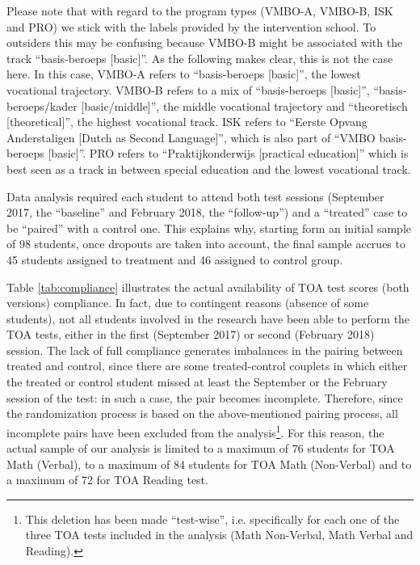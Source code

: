 \documentclass[ 12 pt]{article}
\begin{document}
Please note that with regard to the program types (VMBO-A, VMBO-B, ISK and PRO) we stick with the labels provided by the intervention school. To outsiders this may be confusing because VMBO-B might be associated with the track \enquote{basis-beroeps [basic]}. As the following makes clear, this is not the case here. In this case, VMBO-A refers to \enquote{basis-beroeps [basic]}, the lowest vocational trajectory. VMBO-B refers to a mix of \enquote{basis-beroeps [basic]}, \enquote{basis-beroeps/kader [basic/middle]}, the middle vocational trajectory and \enquote{theoretisch [theoretical]}, the highest vocational track. ISK refers to \enquote{Eerste Opvang Anderstaligen [Dutch as Second Language]}, which is also part of \enquote{VMBO basis-beroeps [basic]}. PRO refers to \enquote{Praktijkonderwijs [practical education]} which is best seen as a track in between special education and the lowest vocational track.

Data analysis required each student to attend both test sessions (September 2017, the \enquote{baseline} and February 2018, the \enquote{follow-up}) and a \enquote{treated} case to be \enquote{paired} with a control one. This explains why, starting form an initial sample of 98 students, once dropouts are taken into account, the final sample accrues to 45 students assigned to treatment and 46 assigned to control group.

Table \ref{tab:compliance} illustrates the actual availability of TOA test scores (both versions) compliance. In fact, due to contingent reasons (absence of some students), not all students involved in the research have been able to perform the TOA tests, either in the first (September 2017) or second (February 2018) session. The lack of full compliance generates imbalances in the pairing between treated and control, since there are some treated-control couplets in which either the treated or control student missed at least the September or the February session of the test: in such a case, the pair becomes incomplete. Therefore, since the randomization process is based on the above-mentioned pairing process, all incomplete pairs have been excluded from the analysis\footnote{This deletion has been made \enquote{test-wise}, i.e. specifically for each one of the three TOA tests included in the analysis (Math Non-Verbal, Math Verbal and Reading).}. For this reason, the actual sample of our analysis is limited to a maximum of 76 students for TOA Math (Verbal), to a maximum of 84 students for TOA Math (Non-Verbal) and to a maximum of 72 for TOA Reading test.
\end{document}
